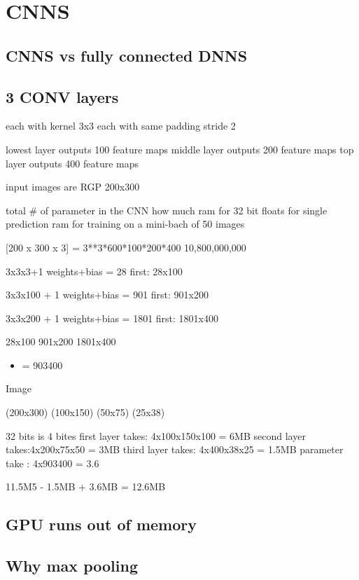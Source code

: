 \documentclass[12pt]{article}
\author{aulw}
\date{\today}
\title{}
\begin{document}
\tableofcontents

\section{CNNS}
\label{sec:orgc7221f7}

\subsection{CNNS vs fully connected DNNS}
\label{sec:orgf680af5}

\subsection{3 CONV layers}
\label{sec:orgd8cdd42}
each with kernel 3x3
each with same padding
stride 2


lowest layer outputs 100 feature maps
middle layer outputs 200 feature maps
top layer outputs 400 feature maps

input images are RGP 200x300

total \# of parameter in the CNN
how much ram for 32 bit floats
for single prediction
ram for training  on a mini-bach of 50 images


[200 x 300 x 3] = 3**3*600*100*200*400
               10,800,000,000

3x3x3+1 weights+bias = 28
first: 28x100


3x3x100 + 1 weights+bias = 901
first: 901x200


3x3x200 + 1 weights+bias = 1801
first: 1801x400




28x100
901x200
1801x400
\begin{itemize}
\item =  903400
\end{itemize}

Image

(200x300) (100x150) (50x75) (25x38)

32 bits is 4 bites
first layer takes: 4x100x150x100 = 6MB
second layer takes:4x200x75x50 = 3MB
third layer takes: 4x400x38x25 = 1.5MB
parameter take : 4x903400 = 3.6

11.5M5 - 1.5MB + 3.6MB = 12.6MB

\subsection{GPU runs out of memory}
\label{sec:org2cccb56}

\subsection{Why max pooling}
\label{sec:orgf999f3a}
\end{document}
